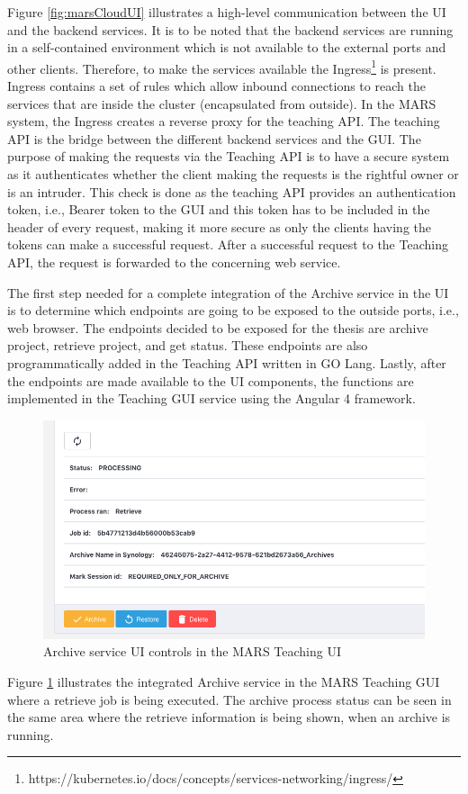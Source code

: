 Figure \ref{fig:marsCloudUI} illustrates a high-level communication between the UI and the backend services. It is to be noted that the backend services
are running in a self-contained environment which is not available to the external ports and other clients. Therefore, 
to make the services available the Ingress\footnote{https://kubernetes.io/docs/concepts/services-networking/ingress/} is present. Ingress contains
a set of rules which allow inbound connections to reach the services that are inside the cluster (encapsulated from outside). In the MARS system,
the Ingress creates a reverse proxy for the teaching API. The teaching API is the bridge between the different backend services and the GUI. The purpose
of making the requests via the Teaching API is to have a secure system as it authenticates whether the client making the requests is the rightful owner or 
is an intruder. This check is done as the teaching API provides an authentication token, i.e., Bearer token to the GUI and this token has to be included in the
header of every request, making it more secure as only the clients having the tokens can make a successful request. After a successful request to the Teaching API,
the request is forwarded to the concerning web service.


The first step needed for a complete integration of the Archive service in the UI is to determine which endpoints are going to be exposed to the outside ports, i.e., web browser.
The endpoints decided to be exposed for the thesis are archive project, retrieve project, and get status. These endpoints are also programmatically added
in the Teaching API written in GO Lang. Lastly, after the endpoints are made available to the UI components, the functions are implemented in the Teaching GUI service
using the Angular 4 framework. 

\begin{figure}[H]
    \centering \includegraphics[scale=0.5]{grafiken/archiveUI.png}
    \caption{Archive service UI controls in the MARS Teaching UI}
    \label{fig:archiveUI}
\end{figure}

Figure \ref{fig:archiveUI} illustrates the integrated Archive service in the MARS Teaching GUI where a retrieve job is being executed. The archive process
status can be seen in the same area where the retrieve information is being shown, when an archive is running.
